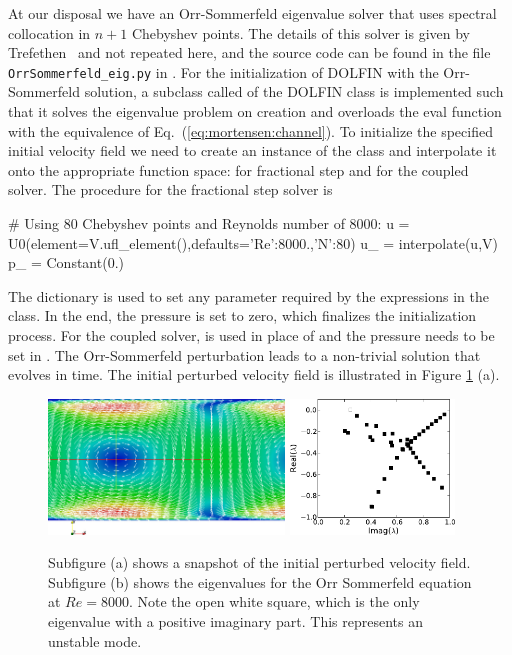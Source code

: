 At our disposal we have an Orr-Sommerfeld eigenvalue solver that uses spectral collocation in $n+1$ Chebyshev points. The details of this solver is given by Trefethen~\cite{tref06} and not repeated here, and the source code can be found in the file {\fontsize{12pt}{12pt}\verb!OrrSommerfeld_eig.py!} in \cite{folder}. For the initialization of DOLFIN  with the Orr-Sommerfeld solution, a subclass called  of the DOLFIN class  is implemented such that it solves the eigenvalue problem on creation and overloads the eval function with the equivalence of Eq.~(\eqref{eq:mortensen:channel}). To initialize the specified initial velocity field we need to create an instance of the  class and interpolate it onto the appropriate function space:  for fractional step and  for the coupled solver. The procedure for the fractional step solver is
\begin{python}
    # Using 80 Chebyshev points and Reynolds number of 8000:
    u = U0(element=V.ufl_element(),defaults={'Re':8000.,'N':80}) 
    u_ = interpolate(u,V)
    p_ = Constant(0.)
\end{python}
The  dictionary is used to set any parameter required by the 
expressions in the  class. In the end, the pressure is set to zero, which finalizes the initialization process. For the coupled solver,  is used in place of  and the pressure needs to be set in . The Orr-Sommerfeld perturbation leads to a non-trivial solution that evolves in time. The initial perturbed velocity field is illustrated in Figure \ref{fig:mortensen:OS_init} (a).
\begin{figure}
 \includegraphics[width=0.56\textwidth]{chapters/mortensen/pdf/OS_init.pdf}
  \includegraphics[width=0.39\textwidth]{chapters/mortensen/pdf/OrrS_eigvals.pdf}
 \caption{Subfigure (a) shows a snapshot of the initial perturbed velocity field. Subfigure (b) shows the eigenvalues for the Orr Sommerfeld equation at $Re=8000$. Note the open white square, which is the only eigenvalue with a positive imaginary part. This represents an unstable mode.}
 \label{fig:mortensen:OS_init}
\end{figure}

